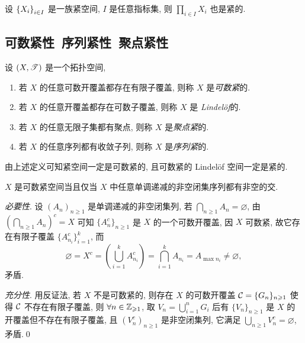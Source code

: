     \begin{Theorem}[Tychonoff]
        设 $ \left\{ X_i \right\}_{i\in I} $ 是一族紧空间, $ I $ 是任意指标集, 则 $ \prod_{i\in I}X_i $ 也是紧的.
    \end{Theorem}

\subsection{可数紧性\ 序列紧性\ 聚点紧性}

    \begin{Definition}
        设 $ (X,\mathscr{T}) $ 是一个拓扑空间,
        \begin{enumerate}
            \item 若 $ X $ 的任意可数开覆盖都存在有限子覆盖, 则称 $ X $ 是\emph{可数紧}的.
            \item 若 $ X $ 的任意开覆盖都存在可数子覆盖, 则称 $ X $ 是 \emph{Lindel\"of}的.
            \item 若 $ X $ 的任意无限子集都有聚点, 则称 $ X $ 是\emph{聚点紧}的.
            \item 若 $ X $ 的任意序列都有收敛子列, 则称 $ X $ 是\emph{序列紧}的.
        \end{enumerate}
    \end{Definition}

    由上述定义可知紧空间一定是可数紧的, 且可数紧的 Lindel\"of 空间一定是紧的.

    \begin{Proposition}[可数紧空间的刻画]
        $ X $ 是可数紧空间当且仅当 $ X $ 中任意单调递减的非空闭集序列都有非空的交.
    \end{Proposition}
    \begin{Proof}
        \textsl{必要性}. 设 $ (A_n)_{n\geqslant 1} $ 是单调递减的非空闭集列, 若 $ \bigcap_{n\geqslant 1}A_n=\varnothing $, 由 $ \left(\bigcap_{n\geqslant 1}A_n\right)^c=X $ 可知 $ \{A_n^c\}_{n\geqslant 1} $ 是 $ X $ 的一个可数开覆盖, 因 $ X $ 可数紧, 故它存在有限子覆盖 $ \{A_{n_i}^c\}_{i=1}^k $, 而
        \[
            \varnothing=X^c=\left(\bigcup_{i=1}^kA_{n_i}^c\right)=\bigcap_{i=1}^kA_{n_i}=A_{\max n_i}\ne\varnothing,
        \]
        矛盾.

        \textsl{充分性}. 用反证法, 若 $ X $ 不是可数紧的, 则存在 $ X $ 的可数开覆盖 $ \mathcal{C}=\{G_n\}_{n\geqslant 1} $ 使得 $ \mathcal{C} $ 不存在有限子覆盖, 则 $ \forall n\in\mathbb{Z}_{\geqslant 1} $, 取 $ V_n=\bigcup_{i=1}^nG_i $ 后有 $ \{V_n\}_{n\geqslant 1} $ 是 $ X $ 的开覆盖但不存在有限子覆盖, 且 $ (V_n^c)_{n\geqslant 1} $ 是非空闭集列, 它满足 $ \bigcup_{n\geqslant 1}V_n^c=\varnothing $, 矛盾.\qed
    \end{Proof}

